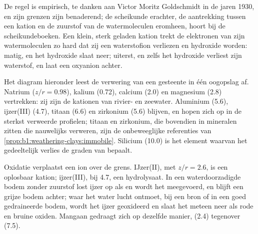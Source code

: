 De regel is empirisch, te danken aan Victor Moritz Goldschmidt in de jaren 1930, en zijn grenzen zijn benaderend; de scheikunde erachter, de aantrekking tussen een kation en de zuurstof van de watermoleculen eromheen, hoort bij de scheikundeboeken. Een klein, sterk geladen kation trekt de elektronen van zijn watermoleculen zo hard dat zij een waterstofion verliezen en hydroxide worden: matig, en het hydroxide slaat neer; uiterst, en zelfs het hydroxide verliest zijn waterstof, en laat een oxyanion achter.

Het diagram hieronder leest de verwering van een gesteente in één oogopslag af. Natrium ($z/r = 0.98$), kalium (0.72), calcium (2.0) en magnesium (2.8) vertrekken: zij zijn de kationen van rivier- en zeewater. Aluminium (5.6), ijzer(III) (4.7), titaan (6.6) en zirkonium (5.6) blijven, en hopen zich op in de sterkst verweerde profielen; titaan en zirkonium, die bovendien in mineralen zitten die nauwelijks verweren, zijn de onbeweeglijke referenties van \cref{prop:b1:weathering-clays:immobile}. Silicium (10.0) is het element waarvan het gedeeltelijk verlies de graden van  bepaalt.

Oxidatie verplaatst een ion over de grens. IJzer(II), met $z/r = 2.6$, is een oplosbaar kation; ijzer(III), bij 4.7, een hydrolysaat. In een waterdoorzadigde bodem zonder zuurstof lost ijzer op als  en wordt het meegevoerd, en blijft een grijze bodem achter; waar het water lucht ontmoet, bij een bron of in een goed gedraineerde bodem, wordt het ijzer geoxideerd en slaat het meteen neer als rode en bruine oxiden. Mangaan gedraagt zich op dezelfde manier,  (2.4) tegenover  (7.5).

